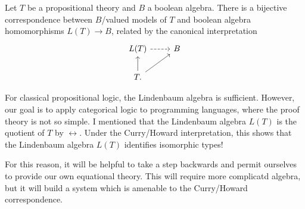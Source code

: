 \documentclass[../main.tex]{subfiles}
\begin{document}
\begin{proposition}
  Let \(T\) be a propositional theory and \(B\) a boolean algebra. There is a
  bijective correspondence between \(B\)\-/valued models of \(T\) and boolean
  algebra homomorphisms \(L(T) \to B\), related by the canonical interpretation
  \[%
    \begin{tikzcd}
      L(T) \arrow[r,dashed] & B\\
      T. \arrow[u] \arrow[ur] &
    \end{tikzcd}
  \]%
\end{proposition}
For classical propositional logic, the Lindenbaum algebra is
sufficient. However, our goal is to apply categorical logic to programming
languages, where the proof theory is not so simple. I mentioned that the
Lindenbaum algebra \(L(T)\) is the quotient of \(T\) by
\(\leftrightarrow\). Under the Curry\-/Howard interpretation, this shows that
the Lindenbaum algebra \(L(T)\) identifies isomorphic types!

For this reason, it will be helpful to take a step backwards and permit
ourselves to provide our own equational theory. This will require more
complicatd algebra, but it will build a system which is amenable to the
Curry\-/Howard correspondence.

\ifSubfilesClassLoaded{%
    }%
\end{document}
